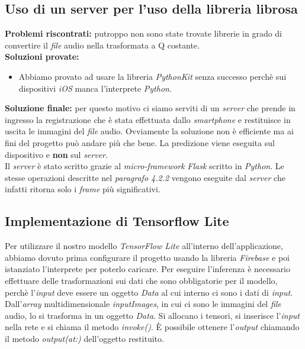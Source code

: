 \subsection{Uso di un server per l'uso della libreria librosa}
\textbf{Problemi riscontrati:} putroppo non sono state trovate librerie in grado di convertire il \textit{file} audio nella trasformata a Q costante.\\
\newline
%
\textbf{Soluzioni provate:}
\begin{itemize}
	\item Abbiamo provato ad usare la libreria \textit{PythonKit} senza successo perchè sui dispositivi \textit{iOS} manca l'interprete \textit{Python}.\\
\end{itemize}
%
\textbf{Soluzione finale:} per questo motivo ci siamo serviti di un \textit{server} che prende in ingresso la registrazione che è stata effettuata dallo \textit{smartphone} e restituisce in uscita le immagini del \textit{file} audio. Ovviamente la soluzione non è efficiente ma ai fini del progetto può andare più che bene. La predizione viene eseguita sul dispositivo e \textbf{non} sul \textit{server}.\\
\newline
Il \textit{server} è stato scritto grazie al \textit{micro-framework} \textit{Flask} scritto in \textit{Python}.
\vspace*{2ex}
\vspace*{2ex}
Le stesse operazioni descritte nel \textit{paragrafo 4.2.2} vengono eseguite dal \textit{server} che infatti ritorna solo i \textit{frame} più significativi.
\subsection{Implementazione di Tensorflow Lite}
Per utilizzare il nostro modello \textit{TensorFlow Lite} all'interno dell'applicazione, abbiamo dovuto prima configurare il progetto usando la libreria \textit{Firebase} e poi istanziato l'interprete per poterlo caricare.
\vspace*{2ex}
\vspace*{2ex}
Per eseguire l'inferenza è necessario effettuare delle trasformazioni sui dati che sono obbligatorie per il modello, perchè l'\textit{input} deve essere un oggetto \textit{Data} al cui interno ci sono i dati di \textit{input}. Dall'\textit{array} multidimensionale \textit{inputImages}, in cui ci sono le immagini del \textit{file} audio, lo si trasforma in un oggetto \textit{Data}.
Si allocano i tensori, si inserisce l'\textit{input} nella rete e si chiama il metodo \textit{invoke()}.
È possibile ottenere l'\textit{output} chiamando il metodo \textit{output(at:)} dell'oggetto restituito.
